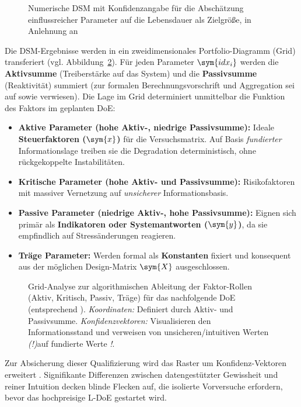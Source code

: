 \begin{figure}[htbp]
    \centering
    \def\svgwidth{0.95\textwidth}
    
    \caption{Numerische \ac{DSM} mit Konfidenzangabe für die Abschätzung einflussreicher Parameter auf die Lebensdauer als Zielgröße, in Anlehnung an \cite{Arndt.2023c,Lindemann.2008, Mayers.1997}}
    \label{fig:n-dsm}
\end{figure}
Die \ac{DSM}-Ergebnisse werden in ein zweidimensionales Portfolio-Diagramm (Grid) transferiert (vgl. Abbildung~\ref{fig:grid_analysis}).
Für jeden Parameter $\sym{idx_i}$ werden die \textbf{Aktivsumme} (Treiberstärke auf das System) und die \textbf{Passivsumme} (Reaktivität) summiert (zur formalen Berechnungsvorschrift und Aggregation sei auf \textcite{Arndt.2023c} sowie \textcite{Mayers.1997} verwiesen).
Die Lage im Grid determiniert unmittelbar die Funktion des Faktors im geplanten \ac{DoE}:
\begin{itemize}
    \item \textbf{Aktive Parameter (hohe Aktiv-, niedrige Passivsumme):}
          Ideale \textbf{Steuerfaktoren ($\sym{x}$)} für die Versuchsmatrix. Auf Basis \textit{fundierter} Informationslage treiben sie die Degradation deterministisch, ohne rückgekoppelte Instabilitäten.
    \item \textbf{Kritische Parameter (hohe Aktiv- und Passivsumme):} Risikofaktoren mit massiver Vernetzung auf \textit{unsicherer} Informationsbasis.
    \item \textbf{Passive Parameter (niedrige Aktiv-, hohe Passivsumme):} Eignen sich primär als \textbf{Indikatoren oder Systemantworten ($\sym{y}$)}, da sie empfindlich auf Stressänderungen reagieren.
    \item \textbf{Träge Parameter:} Werden formal als \textbf{Konstanten} fixiert und konsequent aus der möglichen Design-Matrix $\sym{X}$ ausgeschlossen.
\end{itemize}
\begin{figure}[htbp]
    \centering
    \def\svgwidth{0.8\textwidth}
    
    \caption{Grid-Analyse zur algorithmischen Ableitung der Faktor-Rollen (Aktiv, Kritisch, Passiv, Träge) für das nachfolgende \ac{DoE} (entsprechend \cite{Arndt.2023c}).
        \textit{Koordinaten:} Definiert durch Aktiv- und Passivsumme.
        \textit{Konfidenzvektoren:} Visualisieren den Informationsstand und verweisen von unsicheren/intuitiven Werten \glqq\textit{(!)}\grqq auf fundierte Werte \glqq\textit{!}\grqq.}
    \label{fig:grid_analysis}
\end{figure}
Zur Absicherung dieser Qualifizierung wird das Raster um Konfidenz-Vektoren erweitert \cite{Arndt.2023c}. Signifikante Differenzen zwischen datengestützter Gewissheit und reiner Intuition decken blinde Flecken auf, die isolierte Vorversuche erfordern, bevor das hochpreisige \ac{L-DoE} gestartet wird.

